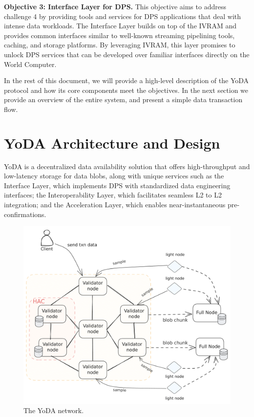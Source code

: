 \documentclass[11pt]{article}
\begin{document}
\noindent \textbf{Objective 3: Interface Layer for DPS.} This objective aims to address challenge 4 by providing tools and services for DPS applications that deal with intense data workloads. The Interface Layer builds on top of the IVRAM and provides common interfaces similar to well-known streaming pipelining tools, caching, and storage platforms. By leveraging IVRAM, this layer promises to unlock DPS services that can be developed over familiar interfaces directly on the World Computer.
\smallskip

In the rest of this document, we will provide a high-level description of the YoDA protocol and how its core components meet the objectives. In the next section we provide an overview of the entire system, and present a simple data transaction flow.

\section{YoDA Architecture and Design}
YoDA is a decentralized data availability solution that offers high-throughput and low-latency storage for data blobs, along with unique services such as the Interface Layer, which implements DPS with standardized data engineering interfaces; the Interoperability Layer, which facilitates seamless L2 to L2 integration; and the Acceleration Layer, which enables near-instantaneous pre-confirmations.

\begin{figure}[htp]
    \centering
    \includegraphics[scale=0.28]{yoda-net (1).pdf}
    \caption{The YoDA network.}
    \label{fig:yoda-net}
\end{figure}
\end{document}
